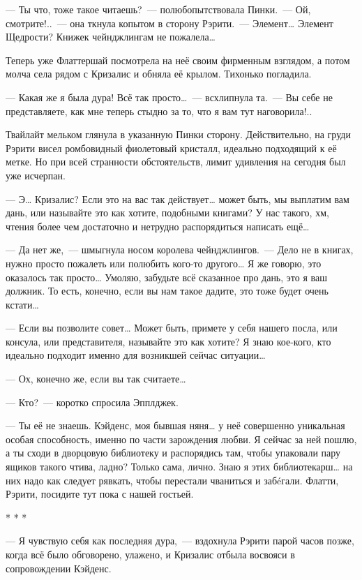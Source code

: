 \documentclass[twoside,a5paper,12pt]{extbook}
\begin{document}
— Ты что, тоже такое читаешь? — полюбопытствовала Пинки. — Ой, смотрите!.. — она ткнула копытом в сторону Рэрити. — Элемент… Элемент Щедрости? Книжек чейнджлингам не пожалела…

Теперь уже Флаттершай посмотрела на неё своим фирменным взглядом, а потом молча села рядом с Кризалис и обняла её крылом. Тихонько погладила.

— Какая же я была дура! Всё так просто… — всхлипнула та. — Вы себе не представляете, как мне теперь стыдно за то, что я вам тут наговорила!..

Твайлайт мельком глянула в указанную Пинки сторону. Действительно, на груди Рэрити висел ромбовидный фиолетовый кристалл, идеально подходящий к её метке. Но при всей странности обстоятельств, лимит удивления на сегодня был уже исчерпан.

— Э… Кризалис? Если это на вас так действует… может быть, мы выплатим вам дань, или называйте это как хотите, подобными книгами? У нас такого, хм, чтения более чем достаточно и нетрудно распорядиться написать ещё…

— Да нет же, — шмыгнула носом королева чейнджлингов. — Дело не в книгах, нужно просто пожалеть или полюбить кого-то другого… Я же говорю, это оказалось так просто… Умоляю, забудьте всё сказанное про дань, это я ваш должник. То есть, конечно, если вы нам такое дадите, это тоже будет очень кстати…

— Если вы позволите совет… Может быть, примете у себя нашего посла, или консула, или представителя, называйте это как хотите? Я знаю кое-кого, кто идеально подходит именно для возникшей сейчас ситуации…

— Ох, конечно же, если вы так считаете…

— Кто? — коротко спросила Эпплджек.

— Ты её не знаешь. Кэйденс, моя бывшая няня… у неё совершенно уникальная особая способность, именно по части зарождения любви. Я сейчас за ней пошлю, а ты сходи в дворцовую библиотеку и распорядись там, чтобы упаковали пару ящиков такого чтива, ладно? Только сама, лично. Знаю я этих библиотекарш… на них надо как следует рявкать, чтобы перестали чваниться и забéгали. Флатти, Рэрити, посидите тут пока с нашей гостьей.

\begin{center}* * *\end{center}

— Я чувствую себя как последняя дура, — вздохнула Рэрити парой часов позже, когда всё было обговорено, улажено, и Кризалис отбыла восвояси в сопровождении Кэйденс.
\end{document}
